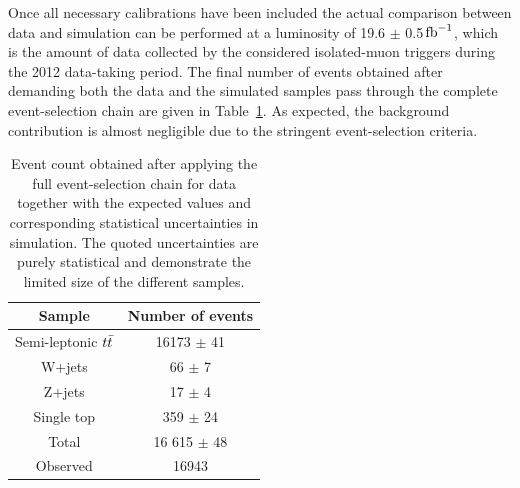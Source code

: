 Once all necessary calibrations have been included the actual comparison between data and simulation can be performed at a luminosity of 19.6 $\pm$ 0.5$\, \mathrm{fb}^{-1}$, which is the amount of data collected by the considered isolated-muon triggers during the 2012 data-taking period.
The final number of events obtained after demanding both the data and the simulated samples pass through the complete event-selection chain are given in Table~\ref{table::DataMCComp}.
As expected, the background contribution is almost negligible due to the stringent event-selection criteria.
\begin{table}[h!t]
 \caption{Event count obtained after applying the full event-selection chain for data together with the expected values and corresponding statistical uncertainties in simulation. The quoted uncertainties are purely statistical and demonstrate the limited size of the different samples.} \label{table::DataMCComp}
 \centering
 \begin{tabular}{c|c}
  \hline
  Sample 			& Number of events 	\\
  \hline
  \hline
  Semi-leptonic $t\bar{t}$ 	& 16173 $\pm$ 41 	\\
  W+jets 			& 66 $\pm$ 7		\\
  Z+jets 			& 17 $\pm$ 4		\\       %
  Single top 			& 359 $\pm$ 24		\\
  \hline
  Total				& 16 615 $\pm$ 48	\\
  \hline
  \hline
  Observed			& 16943			\\
  \hline
 \end{tabular}
\end{table}

